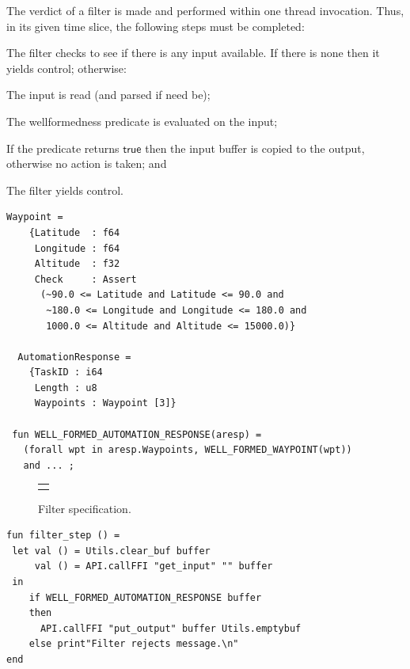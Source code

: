 \documentclass[global,twocolumn]{svjour}
\newcommand{\konst}[1]{\ensuremath{\mathsf{#1}}}
\begin{document}
The verdict of a filter is made and performed within one thread invocation.
%
Thus, in its given time slice, the following steps must be completed:
\begin{compactenum}
\item
The filter checks to see if there is any input available.
%
If there is none then it yields control; otherwise:

\item The input is read (and parsed if need be);

\item The wellformedness predicate is evaluated on the input;

\item If the predicate returns \konst{true} then the input buffer
 is copied to the output, otherwise no action is taken; and

\item The filter yields control.
\end{compactenum}

\newsavebox{\contig}
\begin{lrbox}{\contig}
\begin{lstlisting}[style=myML]
  Waypoint =
    {Latitude  : f64
     Longitude : f64
     Altitude  : f32
     Check     : Assert
      (~90.0 <= Latitude and Latitude <= 90.0 and
       ~180.0 <= Longitude and Longitude <= 180.0 and
       1000.0 <= Altitude and Altitude <= 15000.0)}

  AutomationResponse =
    {TaskID : i64
     Length : u8
     Waypoints : Waypoint [3]}

 fun WELL_FORMED_AUTOMATION_RESPONSE(aresp) =
   (forall wpt in aresp.Waypoints, WELL_FORMED_WAYPOINT(wpt))
   and ... ;
\end{lstlisting}
\end{lrbox}

\begin{figure}
  \begin{center}
    \begin{tabular}{c}
      \resizebox{\columnwidth}{!}{\usebox{\contig}}
    \end{tabular}
  \end{center}
  \caption{Filter specification.}
  \label{fig:filter-spec}
\end{figure}


\newsavebox{\cml}
\begin{lrbox}{\cml}
\begin{lstlisting}[style=myML]
fun filter_step () =
 let val () = Utils.clear_buf buffer
     val () = API.callFFI "get_input" "" buffer
 in
    if WELL_FORMED_AUTOMATION_RESPONSE buffer
    then
      API.callFFI "put_output" buffer Utils.emptybuf
    else print"Filter rejects message.\n"
end
\end{lstlisting}
\end{lrbox}
\end{document}
